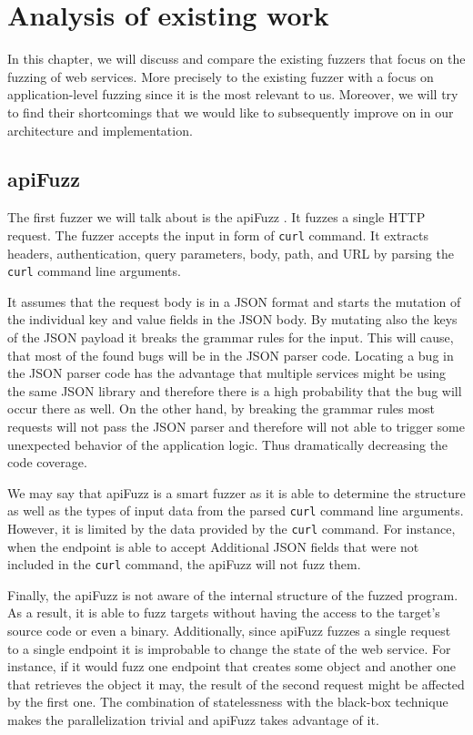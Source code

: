 \chapter{Analysis of existing work}
In this chapter, we will discuss and compare the existing fuzzers that focus on the fuzzing of web services. More precisely to the existing fuzzer with a focus on application-level fuzzing since it is the most relevant to us. \label{sub:Types of fuzzers} Moreover, we will try to find their shortcomings that we would like to subsequently improve on in our architecture and implementation.

\section{apiFuzz}
The first fuzzer we will talk about is the apiFuzz \cite{apiFuzz2020github}. It fuzzes a single HTTP request. The fuzzer accepts the input in form of \texttt{curl} command. It extracts headers, authentication, query parameters, body, path, and URL by parsing the \texttt{curl} command line arguments.

It assumes that the request body is in a JSON format and starts the mutation of the individual key and value fields in the JSON body. By mutating also the keys of the JSON payload it breaks the grammar rules for the input. This will cause, that most of the found bugs will be in the JSON parser code. Locating a bug in the JSON parser code has the advantage that multiple services might be using the same JSON library and therefore there is a high probability that the bug will occur there as well. On the other hand, by breaking the grammar rules most requests will not pass the JSON parser and therefore will not able to trigger some unexpected behavior of the application logic. Thus dramatically decreasing the code coverage.

We may say that apiFuzz is a smart fuzzer as it is able to determine the structure as well as the types of input data from the parsed \texttt{curl} command line arguments. However, it is limited by the data provided by the \texttt{curl} command. For instance, when the endpoint is able to accept Additional JSON fields that were not included in the \texttt{curl} command, the apiFuzz will not fuzz them.

Finally, the apiFuzz is not aware of the internal structure of the fuzzed program. As a result, it is able to fuzz targets without having the access to the target's source code or even a binary. Additionally, since apiFuzz fuzzes a single request to a single endpoint it is improbable to change the state of the web service. For instance, if it would fuzz one endpoint that creates some object and another one that retrieves the object it may, the result of the second request might be affected by the first one. The combination of statelessness with the black-box technique makes the parallelization trivial and apiFuzz takes advantage of it.

